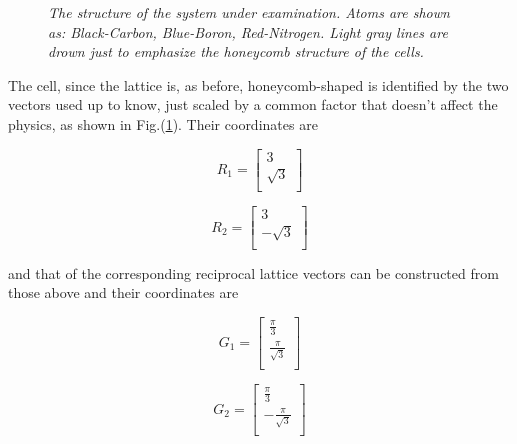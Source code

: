 \documentclass[a4paper]{article}
\begin{document}
\begin{figure}[h!]
\centering
\caption{\label{cbn} \it The structure of the system under examination. Atoms are shown as: Black-Carbon, Blue-Boron, Red-Nitrogen. Light gray lines are drown just to emphasize the honeycomb structure of the cells.}
\end{figure}
The cell, since the lattice is, as before, honeycomb-shaped is identified by the two vectors used up to know, just scaled by a common factor that doesn't affect the physics, as shown in Fig.(\ref{cbn}). Their coordinates are \\
\begin{minipage}{0.5\textwidth}
\centering
\begin{equation*}
R_1 =
\begin{bmatrix}
	3 \\
    \sqrt{3}  \\
    
\end{bmatrix}
\end{equation*}

\end{minipage}
\begin{minipage}{0.5\textwidth}
\centering
\begin{equation*}
R_2 =
\begin{bmatrix}
    3 \\
   -\sqrt{3}  \\
\end{bmatrix}
\end{equation*}
\end{minipage}



and that of the corresponding reciprocal lattice vectors can be constructed from those above and their coordinates are \\
\begin{minipage}{0.5\textwidth}
\centering
\begin{equation*}
G_1 =
\begin{bmatrix}
    \frac{\pi}{3} \\
    \frac{\pi}{\sqrt{3}} \\
\end{bmatrix}
\end{equation*}


\end{minipage}
\begin{minipage}{0.5\textwidth}
\centering
\begin{equation*}
G_2 =
\begin{bmatrix}
    \frac{\pi}{3} \\
    -\frac{\pi}{\sqrt{3}} \\
\end{bmatrix}
\end{equation*}
\end{minipage}
\end{document}
